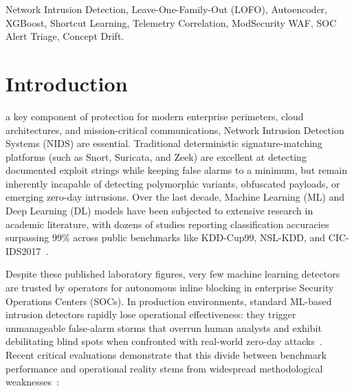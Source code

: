 \documentclass[conference,10pt,twocolumn]{IEEEtran}
\begin{document}
\begin{IEEEkeywords}
Network Intrusion Detection, Leave-One-Family-Out (LOFO), Autoencoder, XGBoost, Shortcut Learning, Telemetry Correlation, ModSecurity WAF, SOC Alert Triage, Concept Drift.
\end{IEEEkeywords}

\section{Introduction}
 a key component of protection for modern enterprise perimeters, cloud architectures, and mission-critical communications, Network Intrusion Detection Systems (NIDS) are essential. Traditional deterministic signature-matching platforms (such as Snort, Suricata, and Zeek) are excellent at detecting documented exploit strings while keeping false alarms to a minimum, but remain inherently incapable of detecting polymorphic variants, obfuscated payloads, or emerging zero-day intrusions. Over the last decade, Machine Learning (ML) and Deep Learning (DL) models have been subjected to extensive research in academic literature, with dozens of studies reporting classification accuracies surpassing 99\% across public benchmarks like KDD-Cup99, NSL-KDD, and CIC-IDS2017~\cite{sharafaldin2020toward,ferrag2020machine,alqatf2020deep}.

Despite these published laboratory figures, very few machine learning detectors are trusted by operators for autonomous inline blocking in enterprise Security Operations Centers (SOCs). In production environments, standard ML-based intrusion detectors rapidly lose operational effectiveness: they trigger unmanageable false-alarm storms that overrun human analysts and exhibit debilitating blind spots when confronted with real-world zero-day attacks~\cite{arp2022dos,sommer2025fallacy}. Recent critical evaluations demonstrate that this divide between benchmark performance and operational reality stems from widespread methodological weaknesses~\cite{sarhan2023cross,engelen2023leave}:
\end{document}

